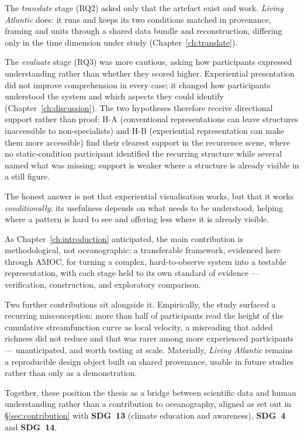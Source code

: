 The \emph{translate} stage (RQ2) asked only that the artefact exist and work. \emph{Living Atlantic} does: it runs and keeps its two conditions matched in provenance, framing and units through a shared data bundle and reconstruction, differing only in the time dimension under study (Chapter~\ref{ch:translate}).

The \emph{evaluate} stage (RQ3) was more cautious, asking how participants expressed understanding rather than whether they scored higher. Experiential presentation did not improve comprehension in every case; it changed how participants understood the system and which aspects they could identify (Chapter~\ref{ch:discussion}). The two hypotheses therefore receive directional support rather than proof: H-A (conventional representations can leave structures inaccessible to non-specialists) and H-B (experiential representation can make them more accessible) find their clearest support in the recurrence scene, where no static-condition participant identified the recurring structure while several named what was missing; support is weaker where a structure is already visible in a still figure.

The honest answer is not that experiential visualisation works, but that it works \emph{conditionally}: its usefulness depends on what needs to be understood, helping where a pattern is hard to see and offering less where it is already visible.

As Chapter~\ref{ch:introduction} anticipated, the main contribution is methodological, not oceanographic: a transferable framework, evidenced here through AMOC, for turning a complex, hard-to-observe system into a testable representation, with each stage held to its own standard of evidence --- verification, construction, and exploratory comparison.

Two further contributions sit alongside it. Empirically, the study surfaced a recurring misconception: more than half of participants read the height of the cumulative streamfunction curve as local velocity, a misreading that added richness did not reduce and that was rarer among more experienced participants --- unanticipated, and worth testing at scale. Materially, \emph{Living Atlantic} remains a reproducible design object built on shared provenance, usable in future studies rather than only as a demonstration.

Together, these position the thesis as a bridge between scientific data and human understanding rather than a contribution to oceanography, aligned as set out in \S\ref{sec:contribution} with \textbf{SDG~13} (climate education and awareness), \textbf{SDG~4} and \textbf{SDG~14}.

